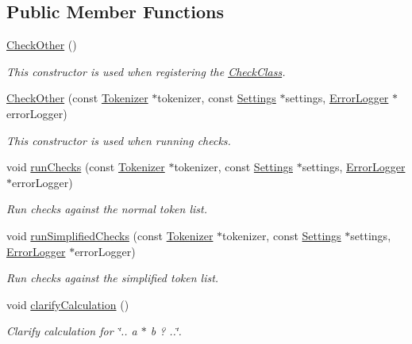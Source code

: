 \subsection*{Public Member Functions}
\begin{DoxyCompactItemize}
\item 
\hyperlink{class_check_other_aa65180181ae5b00c8bf49a6557dd5153}{Check\-Other} ()
\begin{DoxyCompactList}\small\item\em This constructor is used when registering the \hyperlink{class_check_class}{Check\-Class}. \end{DoxyCompactList}\item 
\hyperlink{class_check_other_a4b02d656949fd5d999473a461c3cad97}{Check\-Other} (const \hyperlink{class_tokenizer}{Tokenizer} $\ast$tokenizer, const \hyperlink{class_settings}{Settings} $\ast$settings, \hyperlink{class_error_logger}{Error\-Logger} $\ast$error\-Logger)
\begin{DoxyCompactList}\small\item\em This constructor is used when running checks. \end{DoxyCompactList}\item 
void \hyperlink{class_check_other_a15ba42e338f836e56693f9f9ffedd573}{run\-Checks} (const \hyperlink{class_tokenizer}{Tokenizer} $\ast$tokenizer, const \hyperlink{class_settings}{Settings} $\ast$settings, \hyperlink{class_error_logger}{Error\-Logger} $\ast$error\-Logger)
\begin{DoxyCompactList}\small\item\em Run checks against the normal token list. \end{DoxyCompactList}\item 
void \hyperlink{class_check_other_ab228c1811e7cdacca4a561aa36d00bd5}{run\-Simplified\-Checks} (const \hyperlink{class_tokenizer}{Tokenizer} $\ast$tokenizer, const \hyperlink{class_settings}{Settings} $\ast$settings, \hyperlink{class_error_logger}{Error\-Logger} $\ast$error\-Logger)
\begin{DoxyCompactList}\small\item\em Run checks against the simplified token list. \end{DoxyCompactList}\item 
void \hyperlink{class_check_other_af4322175f29f614cb5d85ce4c8cafc8e}{clarify\-Calculation} ()
\begin{DoxyCompactList}\small\item\em Clarify calculation for \char`\"{}.. a $\ast$ b ? ..\char`\"{}. \end{DoxyCompactList}\item 

\end{DoxyCompactItemize}
